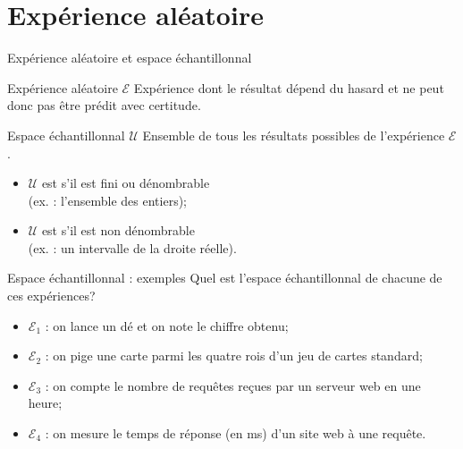\documentclass{BeamerTemplate}
\begin{document}
\section{Expérience aléatoire}

\begin{frame}{Expérience aléatoire et espace échantillonnal}
\begin{Boite}{Expérience aléatoire $\mathcal{E}$}
    Expérience dont le résultat dépend du hasard et ne peut donc pas être prédit avec certitude.
\end{Boite}

\begin{Boite}{Espace échantillonnal $\mathcal{U}$}
    Ensemble de tous les résultats possibles de l'expérience $\mathcal{E}$.
\end{Boite}

\begin{itemize}
\item $\mathcal{U}$ est  s'il est fini ou dénombrable\\
(ex. : l'ensemble des entiers);
\item $\mathcal{U}$ est  s'il est non dénombrable\\
(ex. : un intervalle de la droite réelle).
\end{itemize}

\end{frame}


\begin{frame}{Espace échantillonnal : exemples}
Quel est l'espace échantillonnal de chacune de ces expériences?

\begin{itemize}
    \item $\mathcal{E}_1$ : on lance un dé et on note le chiffre obtenu;
    \vspace{1cm}
    \item $\mathcal{E}_2$ : on pige une carte parmi les quatre rois d'un jeu de cartes standard;
    \vspace{1cm}
    \item $\mathcal{E}_3$ : on compte le nombre de requêtes reçues par un serveur web en une heure;
    \vspace{1cm}
    \item $\mathcal{E}_4$ : on mesure le temps de réponse (en ms) d'un site web à une requête.
    \vspace{1cm}
\end{itemize}
\end{frame}
\end{document}
